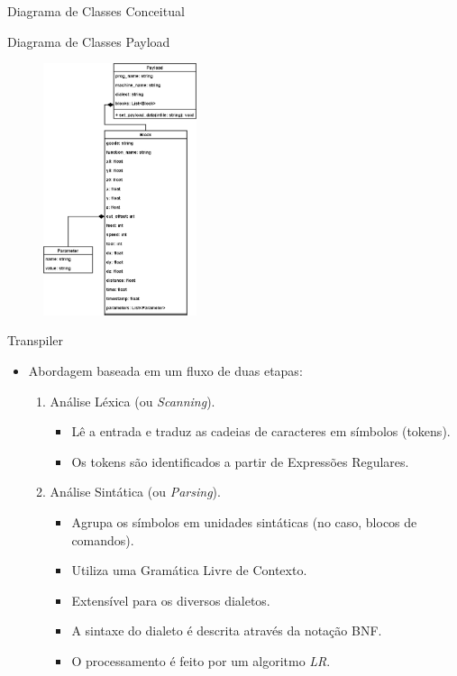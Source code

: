 \documentclass[aspectratio=169]{beamer}
\begin{document}
{\begin{frame}{Diagrama de Classes Conceitual}
\end{frame}


\begin{frame}{Diagrama de Classes Payload}

  \begin{figure}[H]
    \centering
    \includegraphics[width=45mm]{images/class-payload.png}
  \end{figure}

\end{frame}


\begin{frame}{Transpiler}
  \begin{itemize}
    \item Abordagem baseada em um fluxo de duas etapas:
    \begin{enumerate}
      \item Análise Léxica (ou \emph{Scanning}).
      \begin{itemize}
        \item L\^e a entrada e traduz as cadeias de caracteres em símbolos 
             (tokens).
        \item Os tokens são identificados a partir de Expressões Regulares.
      \end{itemize}     

      \item Análise Sintática (ou \emph{Parsing}).
      \begin{itemize}
        \item Agrupa os símbolos em unidades sint\'aticas 
              (no caso, blocos de comandos).
        \item Utiliza uma Gramática Livre de Contexto.
        \item Extensível para os diversos dialetos.
        \item A sintaxe do dialeto é descrita através da notação BNF.
        \item O processamento é feito por um algoritmo \emph{LR}.
      \end{itemize}
    \end{enumerate}
  \end{itemize}
\end{frame}


}
\end{document}
